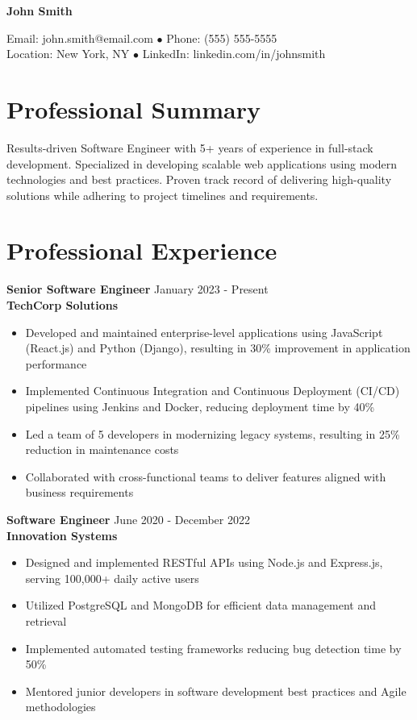 \documentclass{classic}
\newcommand{\name}[1]{%
    \begin{center}
        {\Large\bfseries #1}
    \end{center}
}
\newcommand{\contactline}[4]{%
    \begin{center}
        #1 $\bullet$ #2\\
        #3 $\bullet$ #4
    \end{center}
}
\begin{document}
\name{John Smith}
\contactline{Email: john.smith@email.com}{Phone: (555) 555-5555}
{Location: New York, NY}{LinkedIn: linkedin.com/in/johnsmith}

\section{Professional Summary}
Results-driven Software Engineer with 5+ years of experience in full-stack development. Specialized in developing scalable web applications using modern technologies and best practices. Proven track record of delivering high-quality solutions while adhering to project timelines and requirements.

\section{Professional Experience}

\textbf{Senior Software Engineer} \hfill January 2023 - Present\\
\textbf{TechCorp Solutions}
\begin{itemize}
    \item Developed and maintained enterprise-level applications using JavaScript (React.js) and Python (Django), resulting in 30\% improvement in application performance
    \item Implemented Continuous Integration and Continuous Deployment (CI/CD) pipelines using Jenkins and Docker, reducing deployment time by 40\%
    \item Led a team of 5 developers in modernizing legacy systems, resulting in 25\% reduction in maintenance costs
    \item Collaborated with cross-functional teams to deliver features aligned with business requirements
\end{itemize}

\textbf{Software Engineer} \hfill June 2020 - December 2022\\
\textbf{Innovation Systems}
\begin{itemize}
    \item Designed and implemented RESTful APIs using Node.js and Express.js, serving 100,000+ daily active users
    \item Utilized PostgreSQL and MongoDB for efficient data management and retrieval
    \item Implemented automated testing frameworks reducing bug detection time by 50\%
    \item Mentored junior developers in software development best practices and Agile methodologies
\end{itemize}
\end{document}
